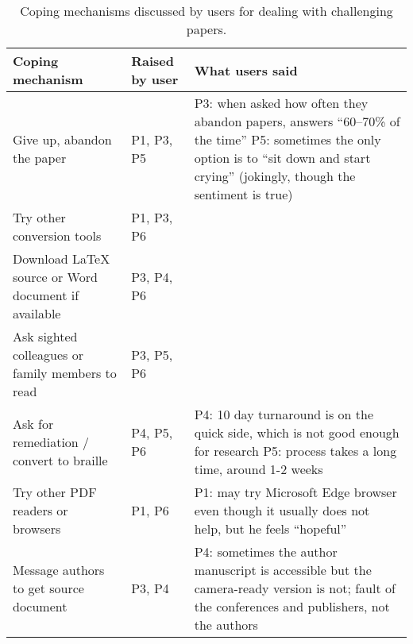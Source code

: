 \begin{table}[t!]
    \small
    \centering
    \begin{tabular}{llp{60mm}}
        \toprule
        \textbf{Coping mechanism} & \textbf{Raised by user} & \textbf{What users said} \\
        \midrule
        Give up, abandon the paper & P1, P3, P5 & P3: when asked how often they abandon papers, answers ``60--70\% of the time'' \newline P5: sometimes the only option is to ``sit down and start crying'' (jokingly, though the sentiment is true) \\
        \midrule
        Try other conversion tools & P1, P3, P6 & \\
        \midrule
        Download LaTeX source or Word document if available & P3, P4, P6 & \\
        \midrule
        Ask sighted colleagues or family members to read & P3, P5, P6 & \\
        \midrule
        Ask for remediation / convert to braille & P4, P5, P6 & P4: 10 day turnaround is on the quick side, which is not good enough for research \newline P5: process takes a long time, around 1-2 weeks \\
        \midrule
        Try other PDF readers or browsers & P1, P6 & P1: may try Microsoft Edge browser even though it usually does not help, but he feels ``hopeful'' \\
        \midrule
        Message authors to get source document & P3, P4 & P4: sometimes the author manuscript is accessible but the camera-ready version is not; fault of the conferences and publishers, not the authors \\
        \bottomrule
    \end{tabular}
    \caption{Coping mechanisms discussed by users for dealing with challenging papers.}
    \label{tab:coping_mechanisms}
    \Description{
    }
\end{table}

